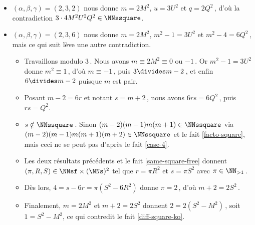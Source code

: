 \begin{itemize}
	\item $(\alpha, \beta, \gamma) = (2, 3, 2)$ nous donne $m = 2 M^2$, $u = 3 U^2$ et $q = 2 Q^2$\,, d'où la contradiction $3 \cdot4 M^2 U^2 Q^2 \in \NNssquare$.


	\item $(\alpha, \beta, \gamma) = (2, 3, 6)$ nous donne $m = 2 M^2$, $m^2 - 1 = 3 U^2$ et $m^2 - 4 = 6 Q^2$\,, mais ce qui suit lève une autre contradiction.
	\begin{itemize}
		\item Travaillons modulo $3$\,.
		Nous avons $m \equiv 2 M^2 \equiv \text{$0$ ou $-1$}$\,. 
		Or $m^2 - 1 = 3 U^2$ donne $m^2 \equiv 1$\,, d'où $m \equiv -1$\,, puis $3 \divides m - 2$\,, et enfin $6 \divides m - 2$ puisque $m$ est pair.
			
		\item Posant $m - 2 = 6 r$ et notant $s = m + 2$\,, nous avons $6 r s = 6 Q^2$\,, puis $r s = Q^2$.
			
		\item $s \notin \NNssquare$\,. Sinon $(m-2)(m-1)m(m+1) \in \NNssquare$ via $(m-2)(m-1)m(m+1)(m+2)  \in \NNssquare$ et le fait \ref{facto-square}, mais ceci ne se peut pas d'après le fait \ref{case-4}.
			
		\item Les deux résultats précédents et le fait \ref{same-square-free} donnent $(\pi, R, S) \in \NNsf \times ( \NNs )^2$ tel que $r = \pi R^2$ et $s = \pi S^2$ avec  $\pi \in \NN_{>1}$\,.
			
		\item Dès lors, $4 = s - 6r = \pi (S^2 - 6 R^2)$ donne $\pi = 2$\,, d'où $m + 2 = 2 S^2$\,.
			
		\item Finalement, $m = 2 M^2$ et $m + 2 = 2 S^2$ donnent $2 = 2(S^2 - M^2)$\,, soit $1 = S^2 - M^2$, ce qui contredit le fait \ref{diff-square-ko}.
		\qedhere
	\end{itemize}
\end{itemize}